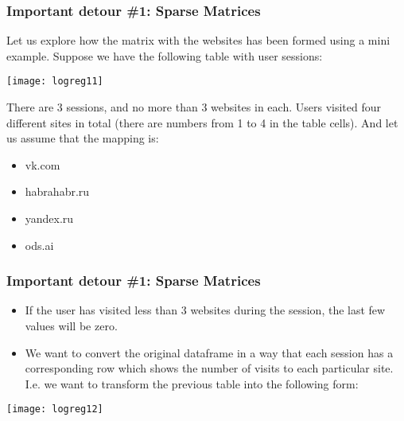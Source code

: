 \begin{frame}[fragile]\frametitle{Important detour \#1: Sparse Matrices}	
Let us explore how the matrix with the websites has been formed using a mini example. Suppose we have the following table with user sessions:

\begin{center}
\texttt{[image: logreg11]}
\end{center}

There are 3 sessions, and no more than 3 websites in each. Users visited four different sites in total (there are numbers from 1 to 4 in the table cells). And let us assume that the mapping is:

\begin{itemize}
\item vk.com
\item habrahabr.ru
\item yandex.ru
\item ods.ai
\end{itemize}
\end{frame}

\begin{frame}[fragile]\frametitle{Important detour \#1: Sparse Matrices}	
\begin{itemize}
\item If the user has visited less than 3 websites during the session, the last few values will be zero. \item We want to convert the original dataframe in a way that each session has a corresponding row which shows the number of visits to each particular site. I.e. we want to transform the previous table into the following form:
\end{itemize}

\begin{center}
\texttt{[image: logreg12]}
\end{center}
\end{frame}

